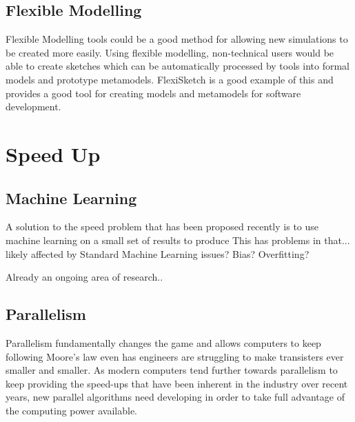 \documentclass{UoYCSproject}
\begin{document}
\subsection{Flexible Modelling}
Flexible Modelling tools could be a good method for allowing new simulations to be created more easily. Using flexible modelling, non-technical users would be able to create sketches which can be automatically processed by tools into formal models and prototype metamodels\cite{Paige2017}. FlexiSketch is a good example of this and provides a good tool for creating models and metamodels for software development\cite{flexisketch}.

\section{Speed Up}

\subsection{Machine Learning}
A solution to the speed problem that has been proposed recently is to use machine learning on a small set of results to produce 
This has problems in that...
likely affected by Standard Machine Learning issues? Bias? Overfitting?

Already an ongoing area of research.. 


\subsection{Parallelism}

Parallelism fundamentally changes the game and allows computers to keep following Moore's law even has engineers are struggling to make transisters ever smaller and smaller\cite{concurrency_revolution}. As modern computers tend further towards parallelism to keep providing the speed-ups that have been inherent in the industry over recent years, new parallel algorithms need developing in order to take full advantage of the computing power available.
\end{document}
